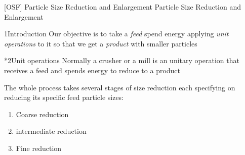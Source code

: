 \documentclass["OSF-Notebook.tex"]{subfiles}
\begin{document}
[OSF]
{Particle Size Reduction and Enlargement} %
{Particle Size Reduction and Enlargement} %

\begin{sectionBox}1{Introduction} %
  Our objective is to take a \emph{feed} spend energy applying \emph{unit operations} to it so that we get a \emph{product} with smaller particles
\end{sectionBox}

\begin{sectionBox}*2{Unit operations} %
  Normally a crusher or a mill is an unitary operation that receives a feed and spends energy to reduce to a product

  The whole process takes several stages of size reduction each specifying on reducing its specific feed particle sizes:
  \begin{enumerate}
    \item Coarse reduction
    \item intermediate reduction
    \item Fine reduction
  \end{enumerate}
\end{sectionBox}
\end{document}
